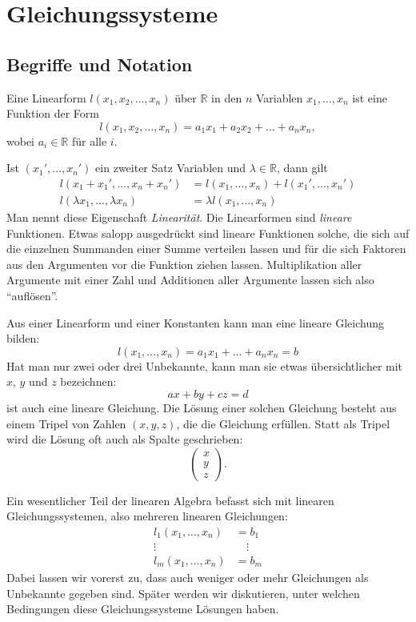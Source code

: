 %
%
%
\section{Gleichungssysteme}
\subsection{Begriffe und Notation}
\begin{definition}
Eine Linearform $l(x_1,x_2,\dots,x_n)$ über $\mathbb R$ in den $n$
Variablen $x_1,\dots,x_n$
ist eine Funktion der Form
\[
l(x_1,x_2,\dots,x_n)=a_1x_1+a_2x_2+\dots+a_nx_n,
\]
wobei $a_i\in\mathbb R$ für alle $i$.
\end{definition}
Ist $(x_1',\dots,x_n')$ ein zweiter Satz Variablen und $\lambda\in\mathbb R$,
dann gilt
\begin{equation}
\begin{aligned}
l(x_1+x_1',\dots,x_n+x_n')&=l(x_1,\dots, x_n)+l(x_1',\dots,x_n')\\
l(\lambda x_1, \dots ,\lambda x_n)&=\lambda l(x_1,\dots,x_n)
\end{aligned}
\label{linearitaet-linearformen}
\end{equation}
Man nennt diese Eigenschaft {\em Linearität}.
Die Linearformen sind
{\em lineare} Funktionen.
%
Etwas salopp ausgedrückt sind lineare Funktionen solche, die sich
auf die einzelnen Summanden einer Summe verteilen lassen und für
die sich Faktoren aus den Argumenten vor die Funktion ziehen lassen.
Multiplikation aller Argumente mit einer Zahl und Additionen aller
Argumente lassen sich also ``auflösen''.

Aus einer Linearform und einer Konstanten kann man eine
lineare Gleichung bilden:
\[
l(x_1,\dots,x_n)=a_1x_1+\dots +a_nx_n=b
\]
Hat man nur zwei oder drei Unbekannte, kann man sie etwas übersichtlicher
mit $x$, $y$ und $z$ bezeichnen:
\[
ax+by+cz=d
\]
ist auch eine lineare Gleichung.
Die Lösung einer solchen Gleichung
besteht aus einem Tripel von Zahlen $(x,y,z)$, die die Gleichung erfüllen.
Statt als Tripel wird die Lösung oft auch als Spalte geschrieben:
\[
\begin{pmatrix}
x\\y\\z
\end{pmatrix}.
\]

Ein wesentlicher Teil der linearen Algebra befasst sich mit linearen
Gleichungssystemen, also mehreren linearen Gleichungen:
\begin{align*}
l_1(x_1,\dots,x_n)&=b_1\\
\vdots\qquad\qquad&\quad\vdots\\
l_m(x_1,\dots,x_n)&=b_m
\end{align*}
Dabei lassen wir vorerst zu, dass auch weniger oder mehr Gleichungen
als Unbekannte gegeben sind.
Später werden wir diskutieren, unter
welchen Bedingungen diese Gleichungssysteme Lösungen haben.

